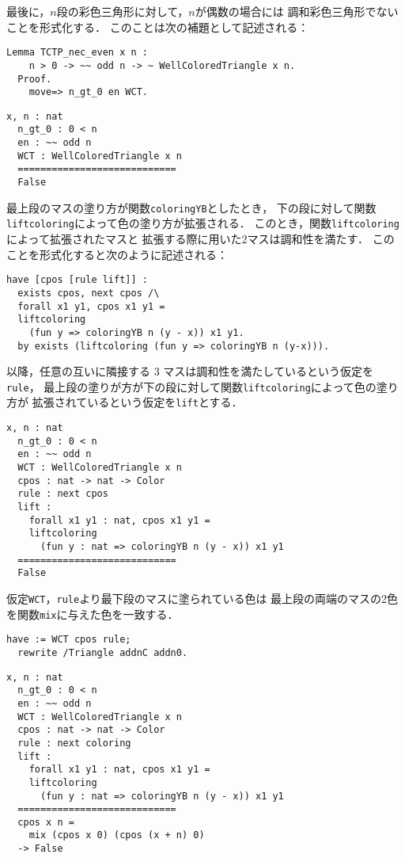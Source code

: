 最後に，$n$段の彩色三角形に対して，$n$が偶数の場合には
調和彩色三角形でないことを形式化する．
このことは次の補題として記述される：
\begin{lstlisting}[language=Coq]
  Lemma TCTP_nec_even x n :
    n > 0 -> ~~ odd n -> ~ WellColoredTriangle x n.
  Proof.
    move=> n_gt_0 en WCT.
\end{lstlisting}
\begin{lstlisting}[language=Coq]
  x, n : nat
  n_gt_0 : 0 < n
  en : ~~ odd n
  WCT : WellColoredTriangle x n
  ============================
  False
\end{lstlisting}
最上段のマスの塗り方が関数{\tt{coloringYB}}としたとき，
下の段に対して関数{\tt{liftcoloring}}によって色の塗り方が拡張される．
このとき，関数{\tt{liftcoloring}}によって拡張されたマスと
拡張する際に用いた2マスは調和性を満たす．
このことを形式化すると次のように記述される：
\begin{lstlisting}[language=Coq]
  have [cpos [rule lift]] :
  exists cpos, next cpos /\
  forall x1 y1, cpos x1 y1 =
  liftcoloring
    (fun y => coloringYB n (y - x)) x1 y1.
  by exists (liftcoloring (fun y => coloringYB n (y-x))).
\end{lstlisting}
以降，任意の互いに隣接する 3 マスは調和性を満たしているという仮定を{\tt{rule}}，
最上段の塗りが方が下の段に対して関数{\tt{liftcoloring}}によって色の塗り方が
拡張されているという仮定を{\tt{lift}}とする．
\begin{lstlisting}[language=Coq]
  x, n : nat
  n_gt_0 : 0 < n
  en : ~~ odd n
  WCT : WellColoredTriangle x n
  cpos : nat -> nat -> Color
  rule : next cpos
  lift :
    forall x1 y1 : nat, cpos x1 y1 =
    liftcoloring
      (fun y : nat => coloringYB n (y - x)) x1 y1
  ============================
  False
\end{lstlisting}
仮定{\tt{WCT}}，{\tt{rule}}より最下段のマスに塗られている色は
最上段の両端のマスの2色を関数{\tt{mix}}に与えた色を一致する．
\begin{lstlisting}[language=Coq]
  have := WCT cpos rule;
  rewrite /Triangle addnC addn0.
\end{lstlisting}
\begin{lstlisting}[language=Coq]
  x, n : nat
  n_gt_0 : 0 < n
  en : ~~ odd n
  WCT : WellColoredTriangle x n
  cpos : nat -> nat -> Color
  rule : next coloring
  lift :
    forall x1 y1 : nat, cpos x1 y1 =
    liftcoloring
      (fun y : nat => coloringYB n (y - x)) x1 y1
  ============================
  cpos x n =
    mix (cpos x 0) (cpos (x + n) 0)
  -> False
\end{lstlisting}
